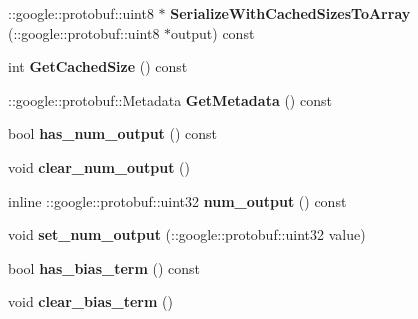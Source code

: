 \begin{DoxyCompactItemize}
\+::google\+::protobuf\+::uint8 $\ast$ {\bfseries Serialize\+With\+Cached\+Sizes\+To\+Array} (\+::google\+::protobuf\+::uint8 $\ast$output) const
\item 
\mbox{\label{classcaffe_1_1_inner_product_parameter_a1ba5b4b06764dff77417c04089a1eef0}} 
int {\bfseries Get\+Cached\+Size} () const
\item 
\mbox{\label{classcaffe_1_1_inner_product_parameter_a786e6b8d354b17bd8faaa7abc2198853}} 
\+::google\+::protobuf\+::\+Metadata {\bfseries Get\+Metadata} () const
\item 
\mbox{\label{classcaffe_1_1_inner_product_parameter_a9002899c49e5572587f301eff1c1c5e0}} 
bool {\bfseries has\+\_\+num\+\_\+output} () const
\item 
\mbox{\label{classcaffe_1_1_inner_product_parameter_a4c291e7248e6da7ae556245b7d561440}} 
void {\bfseries clear\+\_\+num\+\_\+output} ()
\item 
\mbox{\label{classcaffe_1_1_inner_product_parameter_a6a868729705ba6043c61e07176f44b8a}} 
inline \+::google\+::protobuf\+::uint32 {\bfseries num\+\_\+output} () const
\item 
\mbox{\label{classcaffe_1_1_inner_product_parameter_ac472289118306addba4399fffa5906f7}} 
void {\bfseries set\+\_\+num\+\_\+output} (\+::google\+::protobuf\+::uint32 value)
\item 
\mbox{\label{classcaffe_1_1_inner_product_parameter_a3c3f6f3a2aa4906f263aa4e79af260e2}} 
bool {\bfseries has\+\_\+bias\+\_\+term} () const
\item 
\mbox{\label{classcaffe_1_1_inner_product_parameter_a40b151672ffa6ab96ad38287b024d8f3}} 
void {\bfseries clear\+\_\+bias\+\_\+term} ()
\item 
\mbox{\label{classcaffe_1_1_inner_product_parameter_acfcfad4c09210825af196e0f8ff9bf8c}} 

\end{DoxyCompactItemize}
